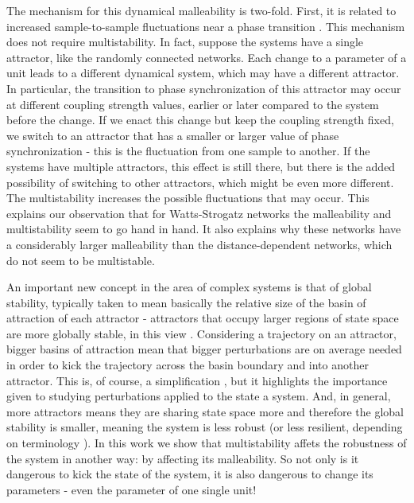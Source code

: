 The mechanism for this dynamical malleability is two-fold. First, it is related to increased sample-to-sample fluctuations near a phase transition \cite{hong2007entrainment, hong2007finitesizescalingpre}. This mechanism does not require multistability. In fact, suppose the systems have a single attractor, like the randomly connected networks. Each change to a parameter of a unit leads to a different dynamical system, which may have a different attractor. In particular, the transition to phase synchronization of this attractor may occur at different coupling strength values, earlier or later compared to the system before the change. If we enact this change but keep the coupling strength fixed, we switch to an attractor that has a smaller or larger value of phase synchronization - this is the fluctuation from one sample to another. If the systems have multiple attractors, this effect is still there, but there is the added possibility of switching to other attractors, which might be even more different. The multistability increases the possible fluctuations that may occur. This explains our observation that for Watts-Strogatz networks the malleability and multistability seem to go hand in hand. It also explains why these networks have a considerably larger malleability than the distance-dependent networks, which do not seem to be multistable.

An important new concept in the area of complex systems is that of global stability, typically taken to mean basically the relative size of the basin of attraction of each attractor - attractors that occupy larger regions of state space are more globally stable, in this view \cite{menck2013how}. Considering a trajectory on an attractor, bigger basins of attraction mean that bigger perturbations are on average needed in order to kick the trajectory across the basin boundary and into another attractor. This is, of course, a simplification \cite{krakovska2023resilience}, but it highlights the importance given to studying perturbations applied to the state a system. And, in general, more attractors means they are sharing state space more and therefore the global stability is smaller, meaning the system is less robust (or less resilient, depending on terminology \cite{krakovska2023resilience}). In this work we show that multistability affets the robustness of the system in another way: by affecting its malleability. So not only is it dangerous to kick the state of the system, it is also dangerous to change its parameters - even the parameter of one single unit!

